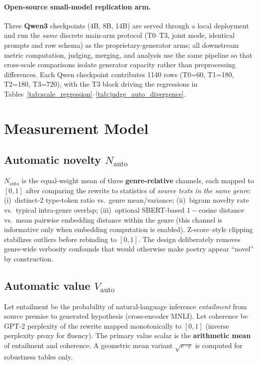 \documentclass[sigconf,nonacm]{acmart}
\begin{document}
\paragraph{Open-source small-model replication arm.}
Three \textbf{Qwen3} checkpoints (4B, 8B, 14B) are served through a local deployment and run the \emph{same} discrete main-arm protocol (T0--T3, joint mode, identical prompts and row schema) as the proprietary-generator arms; all downstream metric computation, judging, merging, and analysis use the same pipeline so that cross-scale comparisons isolate generator capacity rather than preprocessing differences. Each Qwen checkpoint contributes 1140 rows (T0=60, T1=180, T2=180, T3=720), with the T3 block driving the regressions in Tables~\ref{tab:scale_regression}--\ref{tab:judge_auto_divergence}.

\section{Measurement Model}

\subsection{Automatic novelty $N_{\mathrm{auto}}$}

$N_{\mathrm{auto}}$ is the equal-weight mean of three \textbf{genre-relative} channels, each mapped to $[0,1]$ after comparing the rewrite to statistics of \emph{source texts in the same genre}: (i)~distinct-2 type-token ratio vs.\ genre mean/variance; (ii)~bigram novelty rate vs.\ typical intra-genre overlap; (iii)~optional SBERT-based $1{-}$cosine distance vs.\ mean pairwise embedding distance within the genre (this channel is informative only when embedding computation is enabled). Z-score--style clipping stabilizes outliers before rebinding to $[0,1]$. The design deliberately removes genre-wide verbosity confounds that would otherwise make poetry appear ``novel'' by construction.

\subsection{Automatic value $V_{\mathrm{auto}}$}

Let entailment be the probability of natural-language inference \emph{entailment} from source premise to generated hypothesis (cross-encoder MNLI). Let coherence be GPT-2 perplexity of the rewrite mapped monotonically to $[0,1]$ (inverse perplexity proxy for fluency). The primary value scalar is the \textbf{arithmetic mean} of entailment and coherence. A geometric mean variant $\sqrt{e\cdot c}$ is computed for robustness tables only.
\end{document}
